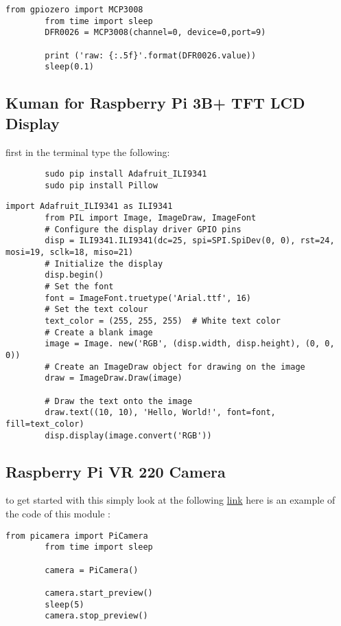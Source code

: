 	\label{adc code}
	\begin{lstlisting}[style=mystyle,caption={ADC code}]
		from gpiozero import MCP3008
		from time import sleep
		DFR0026 = MCP3008(channel=0, device=0,port=9)
	
		print ('raw: {:.5f}'.format(DFR0026.value))
		sleep(0.1)
	\end{lstlisting}
	\subsection{Kuman for Raspberry Pi 3B+ TFT LCD Display}
	first in the terminal type the following:
	\begin{verbatim}
		sudo pip install Adafruit_ILI9341
		sudo pip install Pillow              
	\end{verbatim}
	
	\begin{lstlisting}[style=mystyle,caption={example code for LCD display }]
		import Adafruit_ILI9341 as ILI9341
		from PIL import Image, ImageDraw, ImageFont
		# Configure the display driver GPIO pins
		disp = ILI9341.ILI9341(dc=25, spi=SPI.SpiDev(0, 0), rst=24, mosi=19, sclk=18, miso=21)
		# Initialize the display
		disp.begin()
		# Set the font
		font = ImageFont.truetype('Arial.ttf', 16)
		# Set the text colour
		text_color = (255, 255, 255)  # White text color
		# Create a blank image
		image = Image. new('RGB', (disp.width, disp.height), (0, 0, 0))
		# Create an ImageDraw object for drawing on the image
		draw = ImageDraw.Draw(image)

		# Draw the text onto the image
		draw.text((10, 10), 'Hello, World!', font=font, fill=text_color)
		disp.display(image.convert('RGB'))
	\end{lstlisting}
	\subsection{Raspberry Pi VR 220 Camera}
	to get started with this simply look at the following \href{https://projects.raspberrypi.org/en/projects/getting-started-with-picamera/4}{link}
	here is an example of the code of this module :
	\begin{lstlisting}[style=mystyle,caption={example code for camera}]
		from picamera import PiCamera
		from time import sleep

		camera = PiCamera()

		camera.start_preview()
		sleep(5)
		camera.stop_preview()
	\end{lstlisting}


